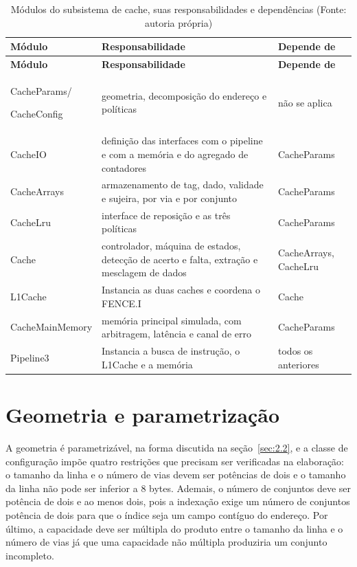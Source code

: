 {\small
\begin{longtable}{@{}>{\raggedright\arraybackslash}p{}>{\raggedright\arraybackslash}p{}>{\raggedright\arraybackslash}p{}@{}}
\caption[Módulos do subsistema de cache, suas responsabilidades e dependências]{Módulos do subsistema de cache, suas responsabilidades e dependências (Fonte: autoria própria)}\label{tab:3.2}\\
\hline
\textbf{Módulo} & \textbf{Responsabilidade} & \textbf{Depende de} \\
\hline
\endfirsthead
\hline
\textbf{Módulo} & \textbf{Responsabilidade} & \textbf{Depende de} \\
\hline
\endhead
\hline
\endlastfoot
CacheParams/

CacheConfig & geometria, decomposição do endereço e políticas & não se aplica \\
CacheIO & definição das interfaces com o pipeline e com a memória e do agregado de contadores & CacheParams \\
CacheArrays & armazenamento de tag, dado, validade e sujeira, por via e por conjunto & CacheParams \\
CacheLru & interface de reposição e as três políticas & CacheParams \\
Cache & controlador, máquina de estados, detecção de acerto e falta, extração e mesclagem de dados & CacheArrays, CacheLru \\
L1Cache & Instancia as duas caches e coordena o FENCE.I & Cache \\
CacheMainMemory & memória principal simulada, com arbitragem, latência e canal de erro & CacheParams \\
Pipeline3 & Instancia a busca de instrução, o L1Cache e a memória & todos os anteriores \\
\end{longtable}
}

\section{Geometria e parametrização}\label{sec:3.2}

A geometria é parametrizável, na forma discutida na seção~\ref{sec:2.2}, e a classe de configuração impõe quatro restrições que precisam ser verificadas na elaboração: o tamanho da linha e o número de vias devem ser potências de dois e o tamanho da linha não pode ser inferior a 8 bytes. Ademais, o número de conjuntos deve ser potência de dois e ao menos dois, pois a indexação exige um número de conjuntos potência de dois para que o índice seja um campo contíguo do endereço. Por último, a capacidade deve ser múltipla do produto entre o tamanho da linha e o número de vias já que uma capacidade não múltipla produziria um conjunto incompleto.

